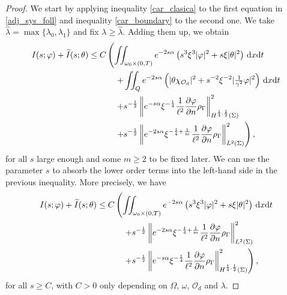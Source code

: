 \documentclass{dcds-bOF}
\theoremstyle{definition}
\def\csbd{\rho_{\Gamma}}
\def\dx{\,\textnormal{d}x}
\def\dt{\textnormal{d}t}
\begin{document}
\begin{proof}
We start by applying inequality \eqref{car_clasica} to the first equation in \eqref{adj_sys_foll} and inequality \eqref{car_boundary} to the second one. We take $\hat \lambda=\max\{\lambda_0,\lambda_1\}$ and fix $\lambda\geq \hat \lambda$. Adding them up, we obtain
%
\begin{equation*}
\begin{split}
I(s;\varphi)+\widetilde{I}(s;\theta)\leq C&\left(\iint_{\omega_0\times(0,T)}e^{-2s\alpha}\left(s^3\xi^3|\varphi|^2+s\xi|\theta|^2\right)\dx\dt \right. \\
&\quad \left. +\iint_Q e^{-2s\alpha}\left(|\theta\chi_{\mathcal O_d}|^2+s^{-2}\xi^{-2}|\tfrac{1}{\gamma^2}\varphi|^2\right)\dx\dt\right. \\
&\quad\left. +s^{-\frac{1}{2}}\left\|e^{-s\alpha}\xi^{-\frac{1}{4}}\frac{1}{\ell^2}\frac{\partial \varphi}{\partial n}\csbd \right\|^2_{H^{\frac{1}{4},\frac{1}{2}}(\Sigma)}\right. \\
&\quad \left. +s^{-\frac{1}{2}}\left\| e^{-2s\alpha}\xi^{-\frac{1}{4}+\frac{1}{m}} \frac{1}{\ell^2}\frac{\partial \varphi}{\partial n} \csbd \right\|^{2}_{L^2(\Sigma)}  \right),
\end{split}
\end{equation*}
%
for all $s$ large enough and some $m\geq 2$ to be fixed later. We can use the parameter $s$ to absorb the lower order terms into the left-hand side in the previous inequality. More precisely, we have
%
\begin{equation}\label{car_con_bound}
\begin{split}
I(s;\varphi)+\widetilde{I}(s;\theta)\leq C&\left(\iint_{\omega_0\times(0,T)}e^{-2s\alpha}\left(s^3\xi^3|\varphi|^2+s\xi|\theta|^2\right)\dx\dt \right. \\
&\quad\left.+ s^{-\frac{1}{2}}\left\| e^{-2s\alpha}\xi^{-\frac{1}{4}+\frac{1}{m}} \frac{1}{\ell^2}\frac{\partial \varphi}{\partial n} \csbd \right\|^{2}_{L^2(\Sigma)} \right. \\
&\quad\left. +s^{-\frac{1}{2}}\left\|e^{-s\alpha}\xi^{-\frac{1}{4}}\frac{1}{\ell^2}\frac{\partial \varphi}{\partial n}\csbd \right\|^2_{H^{\frac{1}{4},\frac{1}{2}}(\Sigma)}  \right),
\end{split}
\end{equation}
%
for all $s\geq C$, with $C>0$ only depending on $\Omega$, $\omega$, $\mathcal O_d$ and $\lambda$.


\end{proof}
\end{document}
